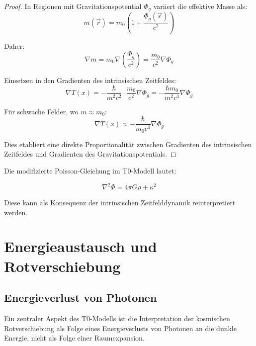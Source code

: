 \documentclass[a4paper,12pt]{article}
\theoremstyle{definition}
\theoremstyle{remark}
\newcommand{\Tfield}{T(x)} %
\begin{document}
	\begin{proof}
		In Regionen mit Gravitationspotential $\Phi_g$ variiert die effektive Masse als:
		\begin{equation}
			m(\vec{r}) = m_0\left(1 + \frac{\Phi_g(\vec{r})}{c^2}\right)
		\end{equation}
		
		Daher:
		\begin{equation}
			\nabla m = m_0 \nabla\left(\frac{\Phi_g}{c^2}\right) = \frac{m_0}{c^2}\nabla\Phi_g
		\end{equation}
		
		Einsetzen in den Gradienten des intrinsischen Zeitfeldes:
		\begin{equation}
			\nabla \Tfield = -\frac{\hbar}{m^2c^2}\cdot\frac{m_0}{c^2}\nabla\Phi_g = -\frac{\hbar m_0}{m^2c^4}\nabla\Phi_g
		\end{equation}
		
		Für schwache Felder, wo $m \approx m_0$:
		\begin{equation}
			\nabla \Tfield \approx -\frac{\hbar}{m_0c^4}\nabla\Phi_g
		\end{equation}
		
		Dies etabliert eine direkte Proportionalität zwischen Gradienten des intrinsischen Zeitfeldes und Gradienten des Gravitationspotentials.
	\end{proof}
	
	Die modifizierte Poisson-Gleichung im T0-Modell lautet:
	
	\begin{equation}
		\nabla^2 \Phi = 4\pi G \rho + \kappa^2
	\end{equation}
	
	Diese kann als Konsequenz der intrinsischen Zeitfelddynamik reinterpretiert werden.
	
	\section{Energieaustausch und Rotverschiebung}
	
	\subsection{Energieverlust von Photonen}
	
	Ein zentraler Aspekt des T0-Modells ist die Interpretation der kosmischen Rotverschiebung als Folge eines Energieverlusts von Photonen an die dunkle Energie, nicht als Folge einer Raumexpansion.
	
\end{document}
